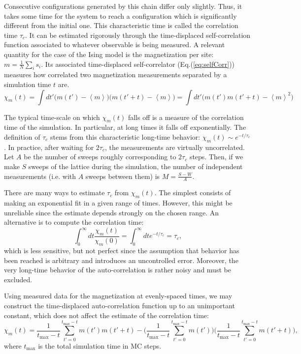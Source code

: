 Consecutive configurations generated by this chain differ only slightly.
Thus, it takes some time for the system to reach a configuration which is significantly different from the initial one.
This characteristic time is called the correlation time $\tau_c$.
It can be estimated rigorously through the time-displaced self-correlation function associated to whatever observable is being measured.
A relevant quantity for the case of the Ising model is the magnetization per site:
$
m = \frac{1}{N} \sum_i s_i
$.
Its associated time-displaced self-correlator (Eq.(\ref{eq:selfCorr})) measures how correlated two magnetization measurements separated by a simulation time $t$ are.
\begin{equation}\label{eq:selfCorr}
\chi_m ( t ) = \int dt' \big( m ( t' ) - \left\langle m \right\rangle \big) \big( m ( t' + t ) - \left\langle m \right\rangle \big) = \int dt' \big( m ( t' ) m ( t' + t ) - \left\langle m \right\rangle^2 \big)
\end{equation}

The typical time-scale on which $\chi_m (t)$ falls off is a measure of the correlation time of the simulation.
In particular, at long times it falls off exponentially.
The definition of $\tau_c$ stems from this characteristic long-time behavior: $\chi_m (t) \sim e^{-t / \tau_c}$.
In practice, after waiting for $2\tau_c$, the measurements are virtually uncorrelated.
Let $A$ be the number of sweeps roughly  corresponding to $2\tau_c$ steps.
Then, if we make $S$ sweeps of the lattice during the simulation, the number of independent measurements (i.e. with $A$ sweeps between them) is 
$
M = \frac{S - W}{A}
$.

There are many ways to estimate $\tau_c$ from $\chi_m (t)$.
The simplest consists of making an exponential fit in a given range of times.
However, this might be unreliable since the estimate depends strongly on the chosen range.
An alternative is to compute the  correlation time:
\begin{equation}
\int_0^\infty dt \frac{\chi_m ( t ) }{\chi_m ( 0 ) } = \int_0^\infty dt e^{-t / \tau_c} = \tau_c  ,
\end{equation}
which is less sensitive, but not perfect since the assumption that  behavior has been reached is arbitrary and introduces an uncontrolled error.
Moreover, the very long-time behavior of the auto-correlation is rather noisy and must be excluded.

Using measured data for the magnetization at evenly-spaced times, we may construct the time-displaced auto-correlation function up to an unimportant constant, which does not affect the estimate of the correlation time:
\begin{equation}
\chi_m (t) = \frac{1}{ t_{\text{max}} - t } \sum_{t' = 0}^{t_{\text{max}} - t } m (t') m(t' + t) - \bigg(\frac{1}{ t_{\text{max}} - t } \sum_{t' = 0}^{t_{\text{max}} - t } m (t')\bigg) \bigg( \frac{1}{ t_{\text{max}} - t } \sum_{t' = 0}^{t_{\text{max}} - t } m(t' + t) \bigg) ,
\end{equation}
where $t_{\text{max}}$ is the total simulation time in MC steps.

